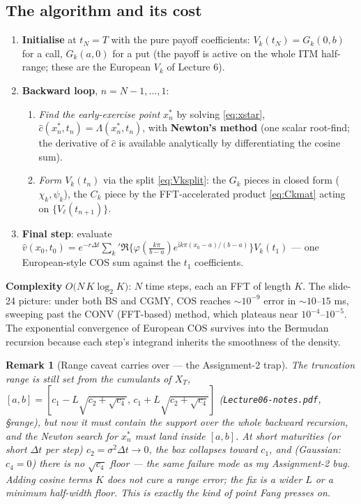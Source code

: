 \documentclass[11pt]{article}
\newcommand{\ii}{\mathrm{i}}
\newcommand{\ch}{\varphi}
\newtheorem{remark}{Remark}
\begin{document}
\subsection{The algorithm and its cost}
\begin{enumerate}[leftmargin=*]
  \item \textbf{Initialise} at $t_N=T$ with the pure payoff coefficients: $V_k(t_N)=G_k(0,b)$ for a call,
  $G_k(a,0)$ for a put (the payoff is active on the whole ITM half-range; these are the European $V_k$ of
  Lecture 6).
  \item \textbf{Backward loop}, $n=N-1,\dots,1$:
  \begin{enumerate}[label=(\alph*)]
    \item \emph{Find the early-exercise point} $x_n^\ast$ by solving \eqref{eq:xstar},
    $\hat c(x_n^\ast,t_n)=\Lambda(x_n^\ast,t_n)$, with \textbf{Newton's method} (one scalar root-find; the
    derivative of $\hat c$ is available analytically by differentiating the cosine sum).
    \item \emph{Form $V_k(t_n)$} via the split \eqref{eq:Vksplit}: the $G_k$ pieces in closed form
    ($\chi_k,\psi_k$), the $C_k$ piece by the FFT-accelerated product \eqref{eq:Ckmat} acting on
    $\{V_\ell(t_{n+1})\}$.
  \end{enumerate}
  \item \textbf{Final step}: evaluate $\hat v(x_0,t_0)=e^{-r\Delta t}\sum_k{}'\Re\{\ch(\tfrac{k\pi}{b-a})
  e^{\ii k\pi(x_0-a)/(b-a)}\}V_k(t_1)$ --- one European-style COS sum against the $t_1$ coefficients.
\end{enumerate}
\textbf{Complexity} $O\big(N\,K\log_2 K\big)$: $N$ time steps, each an FFT of length $K$. The slide-24 picture:
under both BS and CGMY, COS reaches $\sim\!10^{-9}$ error in $\sim\!10$--$15$ ms, sweeping past the CONV (FFT-based)
method, which plateaus near $10^{-4}$--$10^{-5}$. The exponential convergence of European COS survives into the
Bermudan recursion because each step's integrand inherits the smoothness of the density.

\begin{remark}[Range caveat carries over --- the Assignment-2 trap]
The truncation range is still set from the cumulants of $X_T$,
$[a,b]=[c_1-L\sqrt{c_2+\sqrt{c_4}},\,c_1+L\sqrt{c_2+\sqrt{c_4}}]$ (\texttt{Lecture06-notes.pdf}, \S range), but
now it must contain the support over the \emph{whole} backward recursion, and the Newton search for $x_n^\ast$
must land inside $[a,b]$. At short maturities (or short $\Delta t$ per step) $c_2=\sigma^2\Delta t\to0$, the box
collapses toward $c_1$, and (Gaussian: $c_4=0$) there is no $\sqrt{c_4}$ floor --- the same failure mode as my
Assignment-2 bug. Adding cosine terms $K$ does not cure a range error; the fix is a wider $L$ or a minimum
half-width floor. This is exactly the kind of point Fang presses on.
\end{remark}
\end{document}
